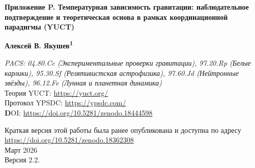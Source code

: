 \documentclass[12pt]{article}
\theoremstyle{remark}
\begin{document}
	
	\begin{titlepage}
		\centering
		\vspace*{0cm}
		
		\Huge\textbf{Приложение P. Температурная зависимость гравитации: наблюдательное подтверждение и теоретическая основа в рамках координационной парадигмы (YUCT)}
		
		\vspace{2.3cm}
		
		\Large\textbf{Алексей В. Якушев\textsuperscript{1}}
		
		\vspace{0.2cm}
		
		\vspace{1.3cm}
		\large\textit{PACS: 04.80.Cc (Экспериментальные проверки гравитации), 97.20.Rp (Белые карлики), 95.30.Sf (Релятивистская астрофизика), 97.60.Jd (Нейтронные звёзды), 96.12.Fe (Лунная и планетная динамика)} \\
		
		Теория YUCT: \url{https://yuct.org/}\\
		Протокол YPSDC: \url{https://ypsdc.com/}\\
		
		\vspace{2cm}
		\textbf DOI: \url{https://doi.org/10.5281/zenodo.18444598}\\
		
		\vspace{1cm}
		
		\large 
		Краткая версия этой работы была ранее опубликована и доступна по адресу\\ \url{https://doi.org/10.5281/zenodo.18362308}\\
		\vspace{1cm}
		Март 2026 \\ \large Версия 2.2.
		

\end{titlepage}
\end{document}
